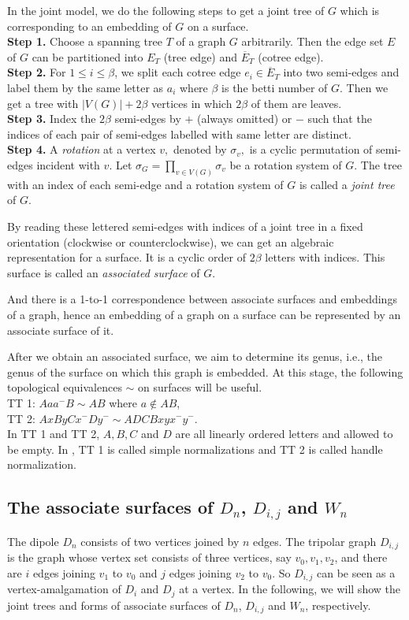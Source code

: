 \documentclass[12pt]{article}
\theoremstyle{definition}
\begin{document}
In the joint model, we do the following steps to get a joint tree of $G$ which is corresponding to an embedding of $G$ on a surface.
\\{\bf Step 1.}  Choose a spanning tree $T$ of a graph $G$ arbitrarily. Then the edge set $E$ of $G$ can be
partitioned into $E_{T}$ (tree edge) and $\overline{E}_{T}$ (cotree
edge).
\\{\bf Step 2.} For $1\leq i\leq \beta$,
we split each cotree edge $e_{i}\in \overline{E}_{T}$ into two semi-edges and label them by the same letter as $a_{i}$ where $\beta$ is the betti
number of $G$. Then we get a tree with $|V(G)|+2\beta$ vertices in which $2\beta$ of them are leaves.
\\{\bf Step 3.} Index the $2\beta$ semi-edges by $+$ (always omitted) or $-$ such that the indices of each
pair of semi-edges labelled with same letter are distinct.
\\{\bf Step 4.} A {\it rotation} at a vertex $v,$ denoted by $\sigma_{v},$  is a
cyclic permutation of semi-edges incident with $v$. Let $\sigma_{G}=\prod_{v\in V(G)}\sigma_{v}$  be a rotation system of
$G$. The tree with an index of each semi-edge and a rotation system of  $G$  is called a {\it joint tree} of $G$.

By reading these lettered
semi-edges with indices of a joint tree in a
fixed orientation (clockwise or counterclockwise), we can get an
algebraic representation for a surface. It is a cyclic order of
$2\beta$ letters with indices. This surface is called an {\it
associated surface} of $G$.

And there is a 1-to-1 correspondence between associate
surfaces and embeddings of a graph, hence an embedding of a graph
on a surface can be represented by an associate surface of it.

 After we obtain an associated surface, we aim to determine its genus, i.e., the genus of the surface on which this graph is embedded. At this stage, the following topological equivalences $\sim$ on surfaces will be useful.
\\TT 1: $Aaa^{-}B\sim AB$ where $a\notin AB$,
\\TT 2: $AxByCx^{-}Dy^{-}\sim ADCBxyx^{-}y^{-}.$\vspace{1mm}
 \\In TT 1 and TT 2, $A,B,C$ and $D$ are all linearly ordered letters and allowed to be empty. In \cite{Ringel74}, TT 1 is called simple normalizations and TT 2 is called handle normalization.


\subsection{The associate surfaces of $D_n$, $D_{i,j}$ and $W_n$} \label{subsec2:2}
The dipole $D_{n}$ consists of two vertices joined by $n$ edges.
The tripolar graph $D_{i,j}$ is the graph whose vertex set consists of three vertices, say $v_0, v_1, v_2$, and there are $i$ edges joining $v_1$ to $v_0$ and $j$ edges joining $v_2$ to $v_0$. So $D_{i,j}$ can be seen as a vertex-amalgamation of $D_i$ and $D_j$ at a vertex.
In the following, we will show the joint trees and forms of associate surfaces of $D_n$, $D_{i,j}$ and $W_n$, respectively.
\end{document}

